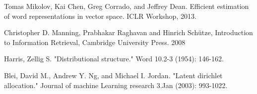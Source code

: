\documentclass[
	12pt, %
	a4paper, %
	oneside, %
	headinclude,footinclude, %
	BCOR5mm, %
]{scrartcl}
\begin{document}
\begin{thebibliography}{12}

    Tomas Mikolov, Kai Chen, Greg Corrado, and Jeffrey Dean. Efficient estimation of word representations
    in vector space. ICLR Workshop, 2013.

	Christopher D. Manning, Prabhakar Raghavan and Hinrich Schütze, Introduction to Information Retrieval, Cambridge University Press. 2008

	Harris, Zellig S. "Distributional structure." Word 10.2-3 (1954): 146-162.
	
	Blei, David M., Andrew Y. Ng, and Michael I. Jordan. "Latent dirichlet allocation." Journal of machine Learning research 3.Jan (2003): 993-1022.
	
\end{thebibliography}

\end{document}
